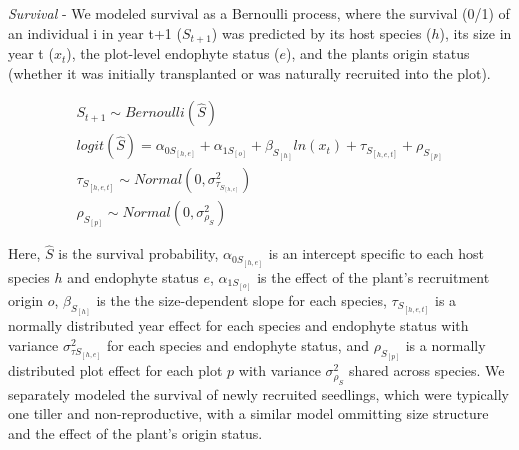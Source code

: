 \documentclass[12pt]{article}
\begin{document}
\emph{Survival} - We modeled survival as a Bernoulli process, where the survival (0/1) of an individual i in year t+1 ($S_{t+1}$) was predicted by its host species ($h$), its size in year t ($x_t$), the plot-level endophyte status ($e$), and the plants origin status (whether it was initially transplanted or was naturally recruited into the plot).

\begin{subequations} 
	\label{eq:survival}
	\begin{align}
		S_{t+1} \sim Bernoulli(\hat{S}) \\
		logit(\hat{S}) =  \alpha_{0S_{[h,e]}} + \alpha_{1S_{[o]}} + \beta_{S_{[h]}}ln(x_t) + \tau_{S_{[h,e,t]}} + \rho_{S_{[p]}} \\
		\tau_{S_{[h,e,t]}} \sim Normal(0, \sigma^2_{\tau_{S_{[h,e]}}})\\
		\rho_{S_{[p]}} \sim Normal(0, \sigma^2_{\rho_{S}})
	\end{align}
\end{subequations}

Here, $\hat{S}$ is the survival probability, $\alpha_{0S_{[h,e]}}$ is an intercept specific to each host species $h$ and endophyte status $e$, $\alpha_{1S_{[o]}}$ is the effect of the plant's recruitment origin $o$,  $\beta_{S_{[h]}}$ is the the size-dependent slope for each species, $\tau_{S_{[h,e,t]}}$ is a normally distributed year effect for each species and endophyte status with variance $\sigma^2_{\tau S_{[h,e]}}$ for each species and endophyte status, and 
$\rho_{S_{[p]}}$ is a normally distributed plot effect for each plot $p$ with variance $\sigma^2_{\rho_{S}}$ shared across species.
We separately modeled the survival of newly recruited seedlings, which were typically one tiller and non-reproductive, with a similar model ommitting size structure and the effect of the plant's origin status.
\end{document}
